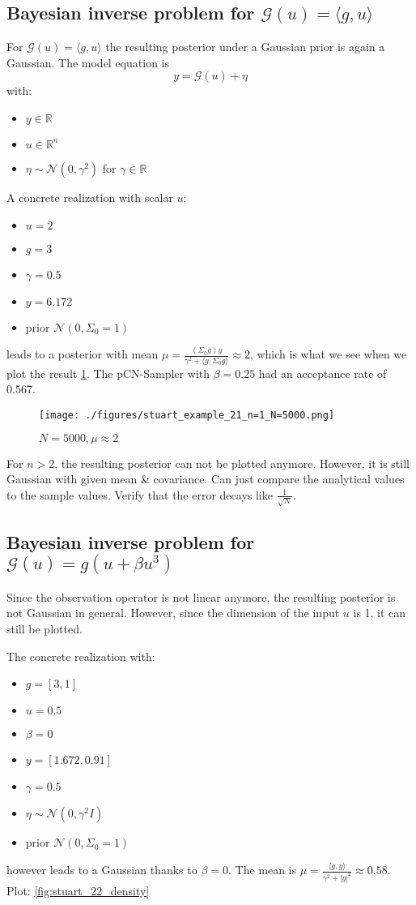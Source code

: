 \documentclass[11pt]{article}
\newcommand{\R}{{\mathbb{R}}}
\newcommand{\G}[1]{{\mathcal{G} \left( #1 \right)}}
\newcommand{\N}[2]{\mathcal{N}\left(#1,#2\right)}
\begin{document}
\subsection{Bayesian inverse problem for \(\G{u} = \langle g,u \rangle\)}
\label{sec:org86ca9de}
For \(\G{u} = \langle g,u \rangle\) the resulting posterior under a Gaussian prior
is again a Gaussian. The model equation is
$$y = \G{u} + \eta$$
with:
\begin{itemize}
\item \(y \in \R\)
\item \(u \in \R^n\)
\item \(\eta \sim \N{0}{\gamma^2}\) for \(\gamma \in \R\)
\end{itemize}

A concrete realization with scalar \(u\):
\begin{itemize}
\item \(u = 2\)
\item \(g = 3\)
\item \(\gamma = 0.5\)
\item \(y=6.172\)
\item prior \(\N{0}{\Sigma_0=1}\)
\end{itemize}
leads to a posterior with mean
\(\mu = \frac{(\Sigma_0g)y}{\gamma^2 + \langle g, \Sigma_0g \rangle} \approx 2\),
which is what we see when we plot the result \ref{fig:stuart_21_density}.
The pCN-Sampler with \(\beta = 0.25\) had an acceptance rate of 0.567.

\begin{figure}[htbp]
\centering
\texttt{[image: ./figures/stuart\_example\_21\_n=1\_N=5000.png]}
\caption{\label{fig:stuart_21_density}
\(N=5000, \mu \approx 2\)}
\end{figure}

For \(n>2\), the resulting posterior can not be plotted anymore. However, it is still Gaussian
with given mean \& covariance. Can just compare the analytical values to the sample values.
Verify that the error decays like \(\frac{1}{\sqrt{N}}\).
\subsection{Bayesian inverse problem for \(\G{u} = g (u + \beta u^3)\)}
\label{sec:org40660ee}
Since the observation operator is not linear anymore, the resulting posterior is not
Gaussian in general. However, since the dimension of the input \(u\) is 1, it can
still be plotted.

The concrete realization with:
\begin{itemize}
\item \(g = [3, 1]\)
\item \(u = 0.5\)
\item \(\beta = 0\)
\item \(y= [1.672, 0.91]\)
\item \(\gamma = 0.5\)
\item \(\eta \sim \N{0}{\gamma^2 I}\)
\item prior \(\N{0}{\Sigma_0=1}\)
\end{itemize}
however leads to a Gaussian thanks to \(\beta = 0\). The mean is
\(\mu = \frac{\langle g,y \rangle}{\gamma^2 + |g|^2} \approx 0.58\). Plot: \ref{fig:stuart_22_density}
\end{document}
